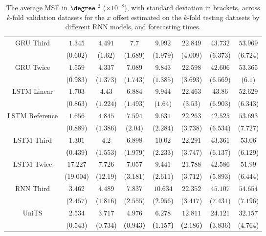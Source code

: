 \begin{table}[!ht]
{\begin{tabular}{|c|c|c|c|c|c|c|c|}
			\multirow{2}{*}{GRU Third} & $1.345$ & $4.491$ & $7.7$ & $9.992$ & $22.849$ & $43.732$ & $53.969$ \\
			 & ($0.602$) & ($1.62$) & ($1.689$) & ($1.979$) & ($4.009$) & ($6.373$) & ($6.724$) \\ \hline
			\multirow{2}{*}{GRU Twice} & $1.559$ & $4.337$ & $7.089$ & $9.843$ & $22.598$ & $42.606$ & $53.365$ \\
			 & ($0.983$) & ($1.373$) & ($1.743$) & ($1.385$) & ($3.693$) & ($6.569$) & ($6.1$) \\ \hline
			\multirow{2}{*}{LSTM Linear} & $1.703$ & $4.43$ & $6.884$ & $9.944$ & $22.463$ & $43.86$ & $52.629$ \\
			 & ($0.863$) & ($1.224$) & ($1.493$) & ($1.64$) & ($3.53$) & ($6.903$) & ($6.343$) \\ \hline
			\multirow{2}{*}{LSTM Reference} & $1.656$ & $4.845$ & $7.594$ & $9.631$ & $22.263$ & $42.525$ & $53.693$ \\
			 & ($0.889$) & ($1.386$) & ($2.04$) & ($2.284$) & ($3.738$) & ($6.534$) & ($7.727$) \\ \hline
			\multirow{2}{*}{LSTM Third} & $\mathbf{1.301}$ & $4.2$ & $6.898$ & $10.02$ & $22.291$ & $43.361$ & $53.06$ \\
			 & \textbf{(}$\mathbf{0.439}$\textbf{)} & ($1.553$) & ($1.979$) & ($2.233$) & ($3.747$) & ($6.137$) & ($6.129$) \\ \hline
			\multirow{2}{*}{LSTM Twice} & $17.227$ & $7.726$ & $7.057$ & $9.441$ & $21.788$ & $42.586$ & $51.99$ \\
			 & ($19.004$) & ($12.19$) & ($3.181$) & ($2.611$) & ($3.712$) & ($5.893$) & ($6.444$) \\ \hline
			\multirow{2}{*}{RNN Third} & $3.462$ & $4.489$ & $7.837$ & $10.634$ & $22.352$ & $45.107$ & $54.654$ \\
			 & ($2.457$) & ($1.816$) & ($2.555$) & ($2.956$) & ($3.417$) & ($7.431$) & ($7.196$) \\ \hline
			\multirow{2}{*}{UniTS} & $2.534$ & $3.717$ & $\mathbf{4.976}$ & $\mathbf{6.278}$ & $\mathbf{12.811}$ & $\mathbf{24.121}$ & $32.157$ \\
			 & ($0.543$) & ($0.734$) & \textbf{(}$\mathbf{0.943}$\textbf{)} & \textbf{(}$\mathbf{1.157}$\textbf{)} & \textbf{(}$\mathbf{2.186}$\textbf{)} & \textbf{(}$\mathbf{3.836}$\textbf{)} & ($4.764$) \\ \hline
		\end{tabular}
	}
	\caption{The average MSE in $\degree$ $^{2}$ ($\times 10^{-8}$), with standard deviation in brackets, across $k$-fold validation datasets for the $x$ offset estimated on the $k$-fold testing datasets by different RNN models, and forecasting times.}
	\label{tab:mann_whitney_longitude_no_abs_MSE}
\end{table}

